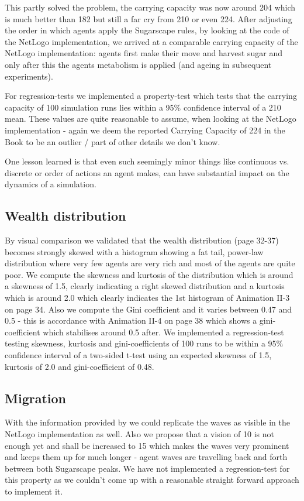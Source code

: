 This partly solved the problem, the carrying capacity was now around 204 which is much better than 182 but still a far cry from 210 or even 224. After adjusting the order in which agents apply the Sugarscape rules, by looking at the code of the NetLogo implementation, we arrived at a comparable carrying capacity of the NetLogo implementation: agents first make their move and harvest sugar and only after this the agents metabolism is applied (and ageing in subsequent experiments).

For regression-tests we implemented a property-test which tests that the carrying capacity of 100 simulation runs lies within a 95\% confidence interval of a 210 mean. These values are quite reasonable to assume, when looking at the NetLogo implementation - again we deem the reported Carrying Capacity of 224 in the Book to be an outlier / part of other details we don't know.

One lesson learned is that even such seemingly minor things like continuous vs. discrete or order of actions an agent makes, can have substantial impact on the dynamics of a simulation.

\subsection{Wealth distribution}
By visual comparison we validated that the wealth distribution (page 32-37) becomes strongly skewed with a histogram showing a fat tail, power-law distribution where very few agents are very rich and most of the agents are quite poor. We compute the skewness and kurtosis of the distribution which is around a skewness of 1.5, clearly indicating a right skewed distribution and a kurtosis which is around 2.0 which clearly indicates the 1st histogram of Animation II-3 on page 34. Also we compute the Gini coefficient and it varies between 0.47 and 0.5 - this is accordance with Animation II-4 on page 38 which shows a gini-coefficient which stabilises around 0.5 after. 
We implemented a regression-test testing skewness, kurtosis and gini-coefficients of 100 runs to be within a 95\% confidence interval of a two-sided t-test using an expected skewness of 1.5, kurtosis of 2.0 and gini-coefficient of 0.48.

\subsection{Migration}
With the information provided by \cite{weaver_replicating_2009} we could replicate the waves as visible in the NetLogo implementation as well. Also we propose that a vision of 10 is not enough yet and shall be increased to 15 which makes the waves very prominent and keeps them up for much longer - agent waves are travelling back and forth between both Sugarscape peaks. We have not implemented a regression-test for this property as we couldn't come up with a reasonable straight forward approach to implement it.

